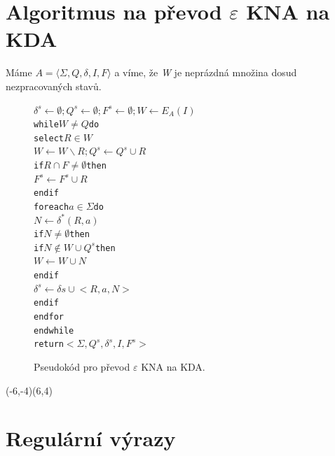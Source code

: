\documentclass[10pt, a4paper, titlepage]{article}
\theoremstyle{note}
\begin{document}
\section{Algoritmus na převod $\varepsilon$ KNA na KDA}

Máme $A = \langle \Sigma, Q, \delta, I, F \rangle$ a víme, že \emph{W} je neprázdná množina dosud nezpracovaných stavů.

\begin{figure}[h]
\begin{alltt}
\( \delta^{s} \leftarrow \emptyset; Q^{s} \leftarrow \emptyset; F^{s} \leftarrow \emptyset; W \leftarrow E_{A}(I) \)
while \( W \neq Q \) do
     select \( R \in W \)
     \( W \leftarrow W \smallsetminus {R}; Q^{s} \leftarrow Q^{s} \cup {R} \)
     if \( R \cap F \neq \emptyset \) then
         \( F^{s} \leftarrow F^{s} \cup {R} \)
     endif
     foreach \( a \in \Sigma \) do
         \( N \leftarrow \delta^{*}(R, a) \)
         if \( N \neq \emptyset \) then
             if \( N \notin W \cup Q^{s} \) then
                 \( W \leftarrow W \cup {N} \)
             endif
             \( \delta^{s} \leftarrow \delta{s} \cup {<R, a, N>} \)
         endif
     endfor
endwhile
return \( <\Sigma, Q^{s}, \delta^{s}, I, F^{s}> \)
\end{alltt}
\caption{Pseudokód pro převod $\varepsilon$ KNA na KDA.}
\end{figure}

\begin{center}
\begin{VCPicture}{(-6,-4)(6,4)}



\end{VCPicture}
\end{center}

\section{Regulární výrazy}
\end{document}
